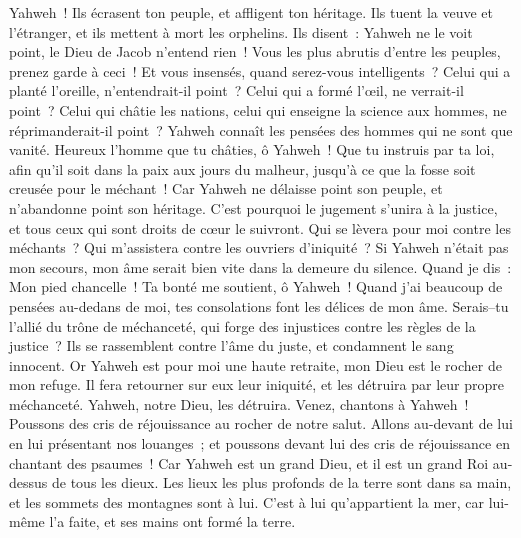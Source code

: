 \begin{multicols}{2}
Yahweh~! Ils écrasent ton peuple, et affligent ton héritage.
Ils tuent la veuve et l'étranger, et ils mettent à mort les orphelins.
Ils disent~: Yahweh ne le voit point, le Dieu de Jacob n'entend rien~!
Vous les plus abrutis d'entre les peuples, prenez garde à ceci~! Et vous insensés, quand serez-vous intelligents~?
Celui qui a planté l'oreille, n'entendrait-il point~? Celui qui a formé l'œil, ne verrait-il point~?
Celui qui châtie les nations, celui qui enseigne la science aux hommes, ne réprimanderait-il point~?
Yahweh connaît les pensées des hommes qui ne sont que vanité.
Heureux l'homme que tu châties, ô Yahweh~! Que tu instruis par ta loi,
afin qu'il soit dans la paix aux jours du malheur, jusqu'à ce que la fosse soit creusée pour le méchant~!
Car Yahweh ne délaisse point son peuple, et n'abandonne point son héritage.
C'est pourquoi le jugement s'unira à la justice, et tous ceux qui sont droits de cœur le suivront.
Qui se lèvera pour moi contre les méchants~? Qui m'assistera contre les ouvriers d'iniquité~?
Si Yahweh n'était pas mon secours, mon âme serait bien vite dans la demeure du silence.
Quand je dis~: Mon pied chancelle~! Ta bonté me soutient, ô Yahweh~!
Quand j'ai beaucoup de pensées au-dedans de moi, tes consolations font les délices de mon âme.
Serais–tu l'allié du trône de méchanceté, qui forge des injustices contre les règles de la justice~?
Ils se rassemblent contre l'âme du juste, et condamnent le sang innocent.
Or Yahweh est pour moi une haute retraite, mon Dieu est le rocher de mon refuge.
Il fera retourner sur eux leur iniquité, et les détruira par leur propre méchanceté. Yahweh, notre Dieu, les détruira.
\VerseOne{}Venez, chantons à Yahweh~! Poussons des cris de réjouissance au rocher de notre salut.
Allons au-devant de lui en lui présentant nos louanges~; et poussons devant lui des cris de réjouissance en chantant des psaumes~!
Car Yahweh est un grand Dieu, et il est un grand Roi au-dessus de tous les dieux.
Les lieux les plus profonds de la terre sont dans sa main, et les sommets des montagnes sont à lui.
C'est à lui qu'appartient la mer, car lui-même l'a faite, et ses mains ont formé la terre.

\end{multicols}
